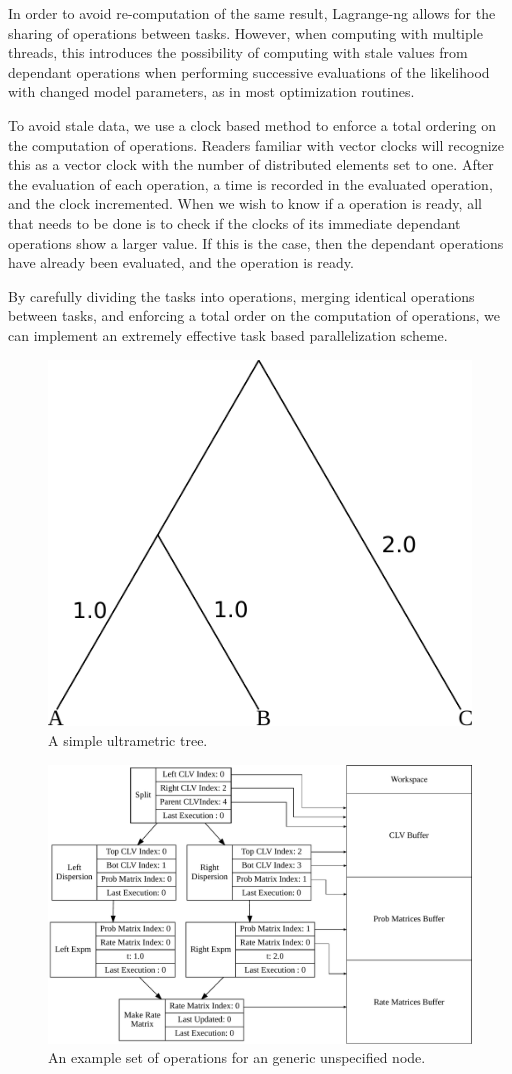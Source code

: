 \documentclass{article}
\begin{document}
In order to avoid re-computation of the same result, Lagrange-ng allows for the sharing of operations between tasks.
However, when computing with multiple threads, this introduces the possibility of computing with stale values from
dependant operations when performing successive evaluations of the likelihood with changed model parameters, as in most
optimization routines.

To avoid stale data, we use a clock based method to enforce a total ordering on the computation of operations. Readers
familiar with vector clocks will recognize this as a vector clock with the number of distributed elements set to one.
After the evaluation of each operation, a time is recorded in the evaluated operation, and the clock incremented. When
we wish to know if a operation is ready, all that needs to be done is to check if the clocks of its immediate dependant
operations show a larger value. If this is the case, then the dependant operations have already been evaluated, and the
operation is ready.

By carefully dividing the tasks into operations, merging identical operations between tasks, and enforcing a total order
on the computation of operations, we can implement an extremely effective task based parallelization scheme. 

\begin{figure}
  \centering
  \includegraphics[width=.5\linewidth]{figures/simple-tree-ultrametric.pdf}
  \caption{A simple ultrametric tree.}
  \label{fig:ultra}
\end{figure}

\begin{figure}
  \centering
  \includegraphics[width=\linewidth]{figures/simple-operations.pdf}
  \caption{An example set of operations for an generic unspecified node.}
  \label{fig:simple-operations}
\end{figure}
\end{document}
